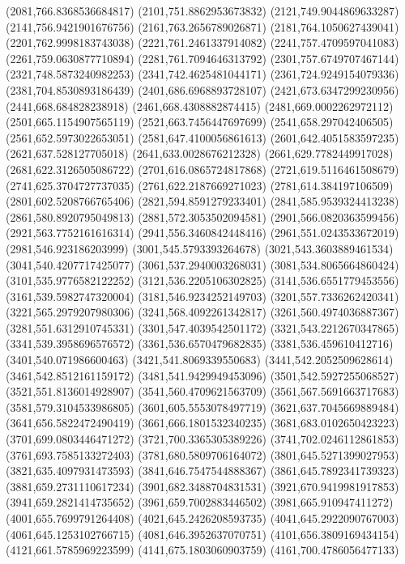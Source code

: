 {(2081,766.8368536684817)
(2101,751.8862953673832)
(2121,749.9044869633287)
(2141,756.9421901676756)
(2161,763.2656789026871)
(2181,764.1050627439041)
(2201,762.9998183743038)
(2221,761.2461337914082)
(2241,757.4709597041083)
(2261,759.0630877710894)
(2281,761.7094646313792)
(2301,757.6749707467144)
(2321,748.5873240982253)
(2341,742.4625481044171)
(2361,724.9249154079336)
(2381,704.8530893186439)
(2401,686.6968893728107)
(2421,673.6347299230956)
(2441,668.684828238918)
(2461,668.4308882874415)
(2481,669.0002262972112)
(2501,665.1154907565119)
(2521,663.7456447697699)
(2541,658.297042406505)
(2561,652.5973022653051)
(2581,647.4100056861613)
(2601,642.4051583597235)
(2621,637.528127705018)
(2641,633.0028676212328)
(2661,629.7782449917028)
(2681,622.3126505086722)
(2701,616.0865724817868)
(2721,619.5116461508679)
(2741,625.3704727737035)
(2761,622.2187669271023)
(2781,614.384197106509)
(2801,602.5208766765406)
(2821,594.8591279233401)
(2841,585.9539324413238)
(2861,580.8920795049813)
(2881,572.3053502094581)
(2901,566.0820363599456)
(2921,563.7752161616314)
(2941,556.3460842448416)
(2961,551.0243533672019)
(2981,546.923186203999)
(3001,545.5793393264678)
(3021,543.3603889461534)
(3041,540.4207717425077)
(3061,537.2940003268031)
(3081,534.8065664860424)
(3101,535.9776582122252)
(3121,536.2205106302825)
(3141,536.6551779453556)
(3161,539.5982747320004)
(3181,546.9234252149703)
(3201,557.7336262420341)
(3221,565.2979207980306)
(3241,568.4092261342817)
(3261,560.4974036887367)
(3281,551.6312910745331)
(3301,547.4039542501172)
(3321,543.2212670347865)
(3341,539.3958696576572)
(3361,536.6570479682835)
(3381,536.459610412716)
(3401,540.071986600463)
(3421,541.8069339550683)
(3441,542.2052509628614)
(3461,542.8512161159172)
(3481,541.9429949453096)
(3501,542.5927255068527)
(3521,551.8136014928907)
(3541,560.4709621563709)
(3561,567.5691663717683)
(3581,579.3104533986805)
(3601,605.5553078497719)
(3621,637.7045669889484)
(3641,656.5822472490419)
(3661,666.1801532340235)
(3681,683.0102650423223)
(3701,699.0803446471272)
(3721,700.3365305389226)
(3741,702.0246112861853)
(3761,693.7585133272403)
(3781,680.5809706164072)
(3801,645.5271399027953)
(3821,635.4097931473593)
(3841,646.7547544888367)
(3861,645.7892341739323)
(3881,659.2731110617234)
(3901,682.3488704831531)
(3921,670.9419981917853)
(3941,659.2821414735652)
(3961,659.7002883446502)
(3981,665.910947411272)
(4001,655.7699791264408)
(4021,645.2426208593735)
(4041,645.2922090767003)
(4061,645.1253102766715)
(4081,646.3952637070751)
(4101,656.3809169434154)
(4121,661.5785969223599)
(4141,675.1803060903759)
(4161,700.4786056477133)
}
